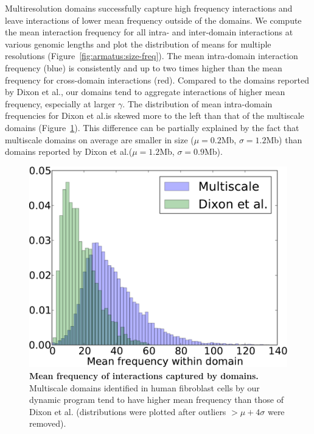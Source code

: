 \documentclass[12pt]{cmuthesis}
\begin{document}
  Multiresolution domains successfully capture high frequency interactions and leave interactions of lower mean frequency outside of the domains. We compute the mean interaction frequency for all intra- and inter-domain interactions at various genomic lengths and plot the distribution of means for multiple resolutions (Figure~\ref{fig:armatus:size-freq}). The mean intra-domain interaction frequency (blue) is consistently and up to two times higher than the mean frequency for cross-domain interactions (red). Compared to the domains reported by Dixon et al., our domains tend to aggregate interactions of higher mean frequency, especially at larger $\gamma$. The distribution of mean intra-domain frequencies for Dixon et al.\@ is skewed more to the left than that of the multiscale domains (Figure~\ref{fig:armatus:freq-distr}). This difference can be partially explained by the fact that multiscale domains on average are smaller in size ($\mu=0.2$Mb, $\sigma=1.2$Mb) than domains reported by Dixon et al.\@ ($\mu=1.2$Mb, $\sigma=0.9$Mb).



  \begin{figure}[ht]
    \centering
      \includegraphics[width=0.6\linewidth]{figures/mean-freq-distr}
      \caption{\textbf{Mean frequency of interactions captured by domains.} Multiscale domains identified in human fibroblast cells by our dynamic program tend to have higher mean frequency than those of Dixon et al. (distributions were plotted after outliers $> \mu+4\sigma$ were removed).}
      \label{fig:armatus:freq-distr}
  \end{figure}



\end{document}

